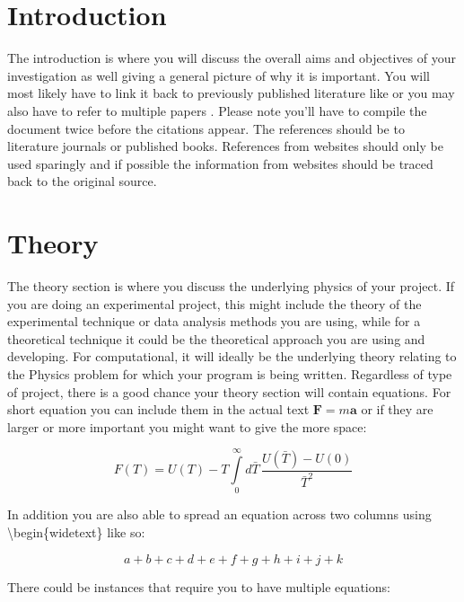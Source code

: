 \documentclass[a4paper, onecolumn, 12pt, notitlepage]{revtex4-1}
\begin{document}
\section{Introduction}
The introduction is where you will discuss the overall aims and objectives of your investigation as well giving a general picture of why it is important. You will most likely have to link it back to previously published literature like  \cite{Paper_1} or you may also have to refer to multiple papers \cite{Paper_1, Paper_2, Paper_3}. Please note you'll have to compile the document twice before the citations appear. The references should be to literature journals or published books. References from websites should only be used sparingly and if possible the information from websites should be traced back to the original source. 




\section{Theory}
The theory section is where you discuss the underlying physics of your project. If you are doing an experimental project, this might include the theory of the experimental technique or data analysis methods you are using, while for a theoretical technique it could be the theoretical approach you are using and developing. For computational, it will ideally be the underlying theory relating to the Physics problem for which your program is being written. Regardless of type of project, there is a good chance your theory section will contain equations. For short equation you can include them in the actual text $\mathbf{F} = m\mathbf{a}$ or if they are larger or more important you might want to give the more space:

\begin{equation}
F(T) = U(T) - T \int\limits_0^\infty d \bar{T} \, \frac{U(\bar{T}) - U(0)}{\bar{T}^2}
\end{equation}

In addition you are also able to spread an equation across two columns using \textbackslash begin\{widetext\} like so:

\begin{widetext}
\[
a + b + c + d+e+f+g+h+i+j+k
\]
\end{widetext}

There could be instances that require you to have multiple equations:
\end{document}
